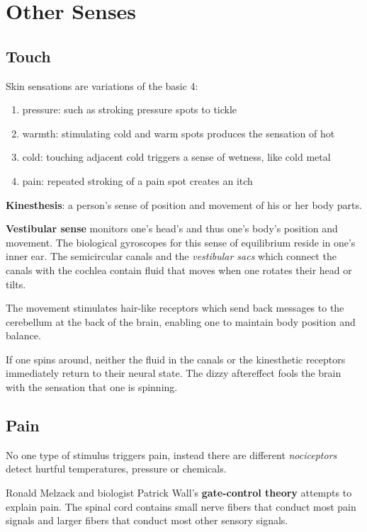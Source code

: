 \documentclass[12pt]{article}
\begin{document}
\section*{Other Senses}
\subsection*{Touch}
Skin sensations are variations of the basic 4:
\begin{enumerate}
  \item pressure: such as stroking pressure spots to tickle
  \item warmth: stimulating cold and warm spots produces the sensation of hot
  \item cold: touching adjacent cold triggers a sense of wetness, like cold metal
  \item pain: repeated stroking of a pain spot creates an itch
\end{enumerate}

\textbf{Kinesthesis}: a person's sense of position and movement of his or her body parts.

\textbf{Vestibular sense} monitors one's head's and thus one's body's position and movement. The biological gyroscopes for this sense of equilibrium reside in one's inner ear. The semicircular canals and the \textit{vestibular sacs} which connect the canals with the cochlea contain fluid that moves when one rotates their head or tilts.

The movement stimulates hair-like receptors which send back messages to the cerebellum at the back of the brain, enabling one to maintain body position and balance.

If one spins around, neither the fluid in the canals or the kinesthetic receptors immediately return to their neural state. The dizzy aftereffect fools the brain with the sensation that one is spinning.

\subsection*{Pain}
No one type of stimulus triggers pain, instead there are different \textit{nociceptors} detect hurtful temperatures, pressure or chemicals. 

Ronald Melzack and biologist Patrick Wall's \textbf{gate-control theory} attempts to explain pain. The spinal cord contains small nerve fibers that conduct most pain signals and larger fibers that conduct most other sensory signals.
\end{document}
